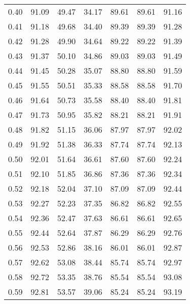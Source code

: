 \begin{tabular}{|c|c|c|c|c|c|c|}
      0.40 &     91.09 &     49.47 &      34.17 &   89.61 &      89.61 &         91.16 \\
      0.41 &     91.18 &     49.68 &      34.40 &   89.39 &      89.39 &         91.28 \\
      0.42 &     91.28 &     49.90 &      34.64 &   89.22 &      89.22 &         91.39 \\
      0.43 &     91.37 &     50.10 &      34.86 &   89.03 &      89.03 &         91.49 \\
      0.44 &     91.45 &     50.28 &      35.07 &   88.80 &      88.80 &         91.59 \\
      0.45 &     91.55 &     50.51 &      35.33 &   88.58 &      88.58 &         91.70 \\
      0.46 &     91.64 &     50.73 &      35.58 &   88.40 &      88.40 &         91.81 \\
      0.47 &     91.73 &     50.95 &      35.82 &   88.21 &      88.21 &         91.91 \\
      0.48 &     91.82 &     51.15 &      36.06 &   87.97 &      87.97 &         92.02 \\
      0.49 &     91.92 &     51.38 &      36.33 &   87.74 &      87.74 &         92.13 \\
      0.50 &     92.01 &     51.64 &      36.61 &   87.60 &      87.60 &         92.24 \\
      0.51 &     92.10 &     51.85 &      36.86 &   87.36 &      87.36 &         92.34 \\
      0.52 &     92.18 &     52.04 &      37.10 &   87.09 &      87.09 &         92.44 \\
      0.53 &     92.27 &     52.23 &      37.35 &   86.82 &      86.82 &         92.55 \\
      0.54 &     92.36 &     52.47 &      37.63 &   86.61 &      86.61 &         92.65 \\
      0.55 &     92.44 &     52.64 &      37.87 &   86.29 &      86.29 &         92.76 \\
      0.56 &     92.53 &     52.86 &      38.16 &   86.01 &      86.01 &         92.87 \\
      0.57 &     92.62 &     53.08 &      38.44 &   85.74 &      85.74 &         92.97 \\
      0.58 &     92.72 &     53.35 &      38.76 &   85.54 &      85.54 &         93.08 \\
      0.59 &     92.81 &     53.57 &      39.06 &   85.24 &      85.24 &         93.19 \\

\end{tabular}
